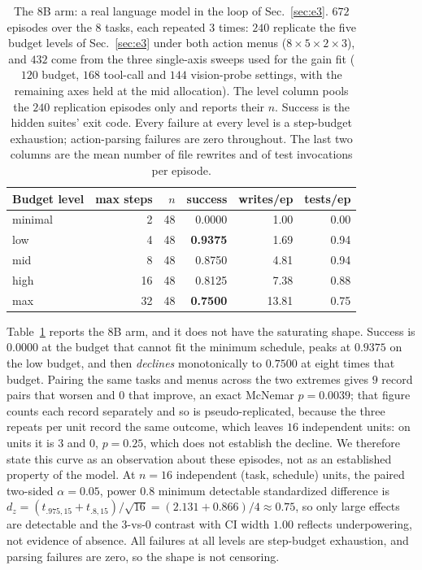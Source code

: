 \documentclass[10pt]{article} %
\begin{document}
\begin{table}[t]
\caption{The $8$B arm: a real language model in the loop of Sec.~\ref{sec:e3}. $672$ episodes
over the $8$ tasks, each repeated $3$ times: $240$ replicate the five budget levels
of Sec.~\ref{sec:e3} under both action menus ($8\times5\times2\times3$), and $432$
come from the three single-axis sweeps used for the gain fit ($120$ budget, $168$
tool-call and $144$ vision-probe settings, with the remaining axes held at the mid
allocation). The level column pools the $240$ replication episodes only and reports
their $n$. Success is the hidden suites' exit code. Every failure at every level is
a step-budget exhaustion; action-parsing failures are zero throughout. The last two
columns are the mean number of file rewrites and of test invocations per episode.}
\label{tab:h4}
\begin{center}
\small
\begin{tabular}{lrrrrr}
\toprule
Budget level & max steps & $n$ & success & writes/ep & tests/ep \\
\midrule
minimal & 2  & 48 & 0.0000 & 1.00 & 0.00 \\
low     & 4  & 48 & \textbf{0.9375} & 1.69 & 0.94 \\
mid     & 8  & 48 & 0.8750 & 4.81 & 0.94 \\
high    & 16 & 48 & 0.8125 & 7.38 & 0.88 \\
max     & 32 & 48 & \textbf{0.7500} & 13.81 & 0.75 \\
\bottomrule
\end{tabular}
\end{center}
\end{table}

Table~\ref{tab:h4} reports the $8$B arm, and it does not have the saturating shape. Success
is $0.0000$ at the budget that cannot fit the minimum schedule, peaks at $0.9375$ on the
low budget, and then \emph{declines} monotonically to $0.7500$ at eight times that
budget. Pairing the same tasks and menus across the two extremes gives $9$ record pairs that
worsen and $0$ that improve, an exact McNemar $p{=}0.0039$; that figure counts each record
separately and so is pseudo-replicated, because the three repeats per unit
record the same outcome, which leaves $16$ independent units: on units it is $3$ and $0$, $p{=}0.25$, which does not establish the decline. We therefore state this curve as an observation about these episodes, not as an established property of the model. At $n{=}16$ independent (task, schedule) units, the paired two-sided $\alpha{=}0.05$, power $0.8$ minimum detectable standardized difference is $d_z{=}(t_{.975,15}{+}t_{.8,15})/\sqrt{16}{=}(2.131{+}0.866)/4{\approx}0.75$, so only large effects are detectable and the $3$-vs-$0$ contrast with CI width $1.00$ reflects underpowering, not evidence of absence. All failures at all levels
are step-budget exhaustion, and parsing failures are zero, so the shape is not censoring.
\end{document}
